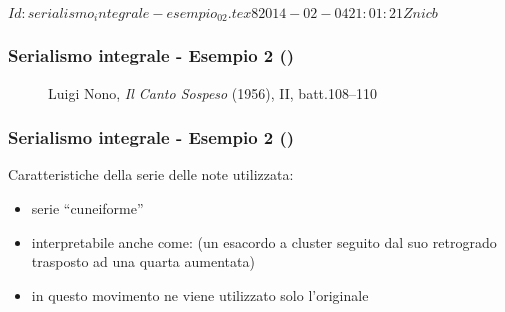 %
%
\svnInfo $Id: serialismo_integrale-esempio_02.tex 8 2014-02-04 21:01:21Z nicb $

\setcounter{ms}{0}
\begin{frame}
    \frametitle{Serialismo integrale - Esempio 2 ()}

    \begin{center}
        \begin{figure}
            \caption{Luigi Nono, \emph{Il Canto Sospeso} (1956), II, batt.108--110}
        \end{figure}
    \end{center}

\end{frame}

\begin{frame}
    \frametitle{Serialismo integrale - Esempio 2 ()}

    Caratteristiche della serie delle note utilizzata:

    \begin{center}
    \end{center}

    \begin{itemize}

        \item serie ``cuneiforme''

        \item interpretabile anche come:
            (un esacordo a cluster seguito dal suo retrogrado
            trasposto ad una quarta aumentata)

        \item in questo movimento ne viene utilizzato solo l'originale

    \end{itemize}

\end{frame}

